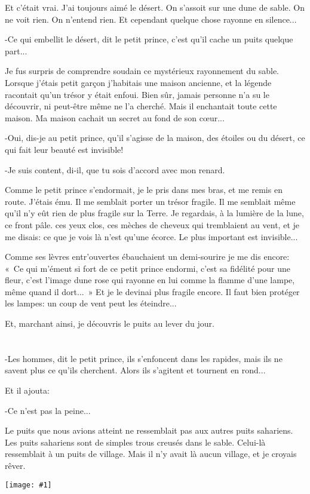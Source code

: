 \documentclass{report}
\newcommand{\parachapter}[2][]{\end{paracol}\chapter[#1]{#2}\begin{paracol}{2}}
\newcommand{\incpic}[1]{%
\end{paracol}
\begin{center}
    \texttt{[image: \#1]}
\end{center}
\begin{paracol}{2}}
\begin{document}
\begin{paracol}{2}
Et c'était vrai. J'ai toujours aimé le désert. On s'assoit sur une dune de sable. On ne voit rien. On n'entend rien. Et cependant quelque chose rayonne en silence...

-Ce qui embellit le désert, dit le petit prince, c'est qu'il cache un puits quelque part...

Je fus surpris de comprendre soudain ce mystérieux rayonnement du sable. Lorsque j'étais petit garçon j'habitais une maison ancienne, et la légende racontait qu'un trésor y était enfoui. Bien sûr, jamais personne n'a su le découvrir, ni peut-être même ne l'a cherché. Mais il enchantait toute cette maison. Ma maison cachait un secret au fond de son cœur...

-Oui, dis-je au petit prince, qu'il s'agisse de la maison, des étoiles ou du désert, ce qui fait leur beauté est invisible!

-Je suis content, di-il, que tu sois d'accord avec mon renard.

Comme le petit prince s'endormait, je le pris dans mes bras, et me remis en route. J'étais ému. Il me semblait porter un trésor fragile. Il me semblait même qu'il n'y eût rien de plus fragile sur la Terre. Je regardais, à la lumière de la lune, ce front pâle. ces yeux clos, ces mèches de cheveux qui tremblaient au vent, et je me disais: ce que je vois là n'est qu'une écorce. Le plus important est invisible...

Comme ses lèvres entr'ouvertes ébauchaient un demi-sourire je me dis encore: «~Ce qui m'émeut si fort de ce petit prince endormi, c'est sa fidélité pour une fleur, c'est l'image dune rose qui rayonne en lui comme la flamme d'une lampe, même quand il dort...~» Et je le devinai plus fragile encore. Il faut bien protéger les lampes: un coup de vent peut les éteindre...

Et, marchant ainsi, je découvris le puits au lever du jour.
\parachapter{} %
-Les hommes, dit le petit prince, ils s'enfoncent dans les rapides, mais ils ne savent plus ce qu'ils cherchent. Alors ils s'agitent et tournent en rond...

Et il ajouta:

-Ce n'est pas la peine...

Le puits que nous avions atteint ne ressemblait pas aux autres puits sahariens. Les puits sahariens sont de simples trous creusés dans le sable. Celui-là ressemblait à un puits de village. Mais il n'y avait là aucun village, et je croyais rêver.

\incpic{pic/image41.jpeg}


\end{paracol}
\end{document}
